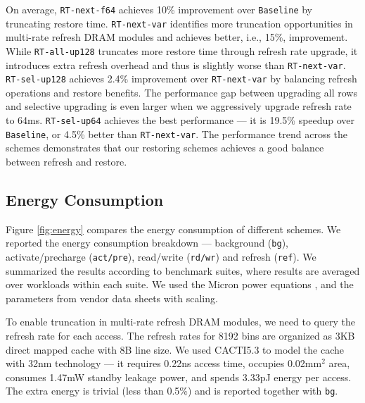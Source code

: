 On average, \texttt{RT-next-f64} achieves 10\% improvement over {\tt Baseline} by truncating restore time. {\tt RT-next-var} identifies more truncation opportunities in multi-rate refresh DRAM modules and achieves better, i.e., 15\%, improvement. 
While {\tt RT-all-up128} truncates more restore time through refresh rate upgrade, it introduces extra refresh overhead and thus is slightly worse than {\tt RT-next-var}.
\texttt{RT-sel-up128} achieves 2.4\% improvement over \texttt{RT-next-var}
by balancing refresh operations and restore benefits. 
The performance gap between upgrading all rows and selective upgrading is even larger when we aggressively upgrade refresh rate to 64ms. \texttt{RT-sel-up64} achieves the best performance --- it is 19.5\% speedup over {\tt Baseline}, or 4.5\% better than \texttt{RT-next-var}.
The performance trend across the schemes demonstrates that our restoring schemes achieves a good balance between refresh and restore.


\subsection{Energy Consumption}\label{subsec:energy}
Figure \ref{fig:energy} compares the energy consumption of different schemes. 
We reported the energy consumption breakdown ---  background ({\tt bg}), activate/precharge ({\tt act/pre}), read/write ({\tt rd/wr}) and refresh ({\tt ref}). We summarized the results according to benchmark suites, where results are averaged over workloads within each suite.
We used the Micron power equations \cite{TOOL:power}, and the parameters from vendor data sheets \cite{SIMU:datasheet} with scaling. 

To enable truncation in multi-rate refresh DRAM modules, we need to query the refresh rate for each access. The refresh rates for 8192 bins are organized as 3KB direct mapped cache with 8B line size. We used CACTI5.3 \cite{URL:cacti} to model the cache with 32nm technology --- it requires 0.22ns access time, occupies 0.02mm$^2$ area, consumes 1.47mW standby leakage power, and spends 3.33pJ energy per access. The extra energy is trivial (less than 0.5\%) and is reported together with {\tt bg}. 

